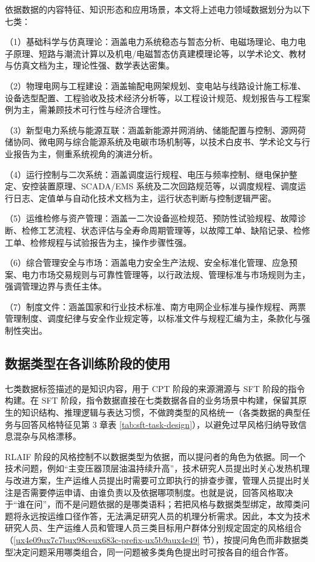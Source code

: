 \documentclass[fontset=fandol,type=master,campus=shenzhen,etitleauto=true]{hithesisbook}
\begin{document}
依据数据的内容特征、知识形态和应用场景，本文将上述电力领域数据划分为以下七类：

\noindent （1）基础科学与仿真理论：涵盖电力系统稳态与暂态分析、电磁场理论、电力电子原理、短路与潮流计算以及机电/电磁暂态仿真建模理论等，以学术论文、教材与仿真文档为主，理论性强、数学表达密集。

\noindent （2）物理电网与工程建设：涵盖输配电网架规划、变电站与线路设计施工标准、设备选型配置、工程验收及技术经济分析等，以工程设计规范、规划报告与工程案例为主，需兼顾技术可行性与经济合理性。

\noindent （3）新型电力系统与能源互联：涵盖新能源并网消纳、储能配置与控制、源网荷储协同、微电网与综合能源系统及电碳市场机制等，以技术白皮书、学术论文与行业报告为主，侧重系统视角的演进分析。

\noindent （4）运行控制与二次系统：涵盖调度运行规程、电压与频率控制、继电保护整定、安控装置原理、SCADA/EMS 系统及二次回路规范等，以调度规程、调度运行日志、定值单与自动化技术文档为主，运行状态判断与控制逻辑严密。

\noindent （5）运维检修与资产管理：涵盖一二次设备巡检规范、预防性试验规程、故障诊断、检修工艺流程、状态评估与全寿命周期管理等，以故障工单、缺陷记录、检修工单、检修规程与试验报告为主，操作步骤性强。

\noindent （6）综合管理安全与市场：涵盖电力安全生产法规、安全标准化管理、应急预案、电力市场交易规则与可靠性管理等，以行政法规、管理标准与市场规则为主，强调管理边界与责任主体。

\noindent （7）制度文件：涵盖国家和行业技术标准、南方电网企业标准与操作规程、两票管理制度、调度纪律与安全作业规定等，以标准文件与规程汇编为主，条款化与强制性突出。

\subsection{数据类型在各训练阶段的使用}\label{subsec:data-mapping}

七类数据标签描述的是知识内容，用于 CPT 阶段的来源溯源与 SFT 阶段的指令构建。在 SFT 阶段，指令数据直接在七类数据各自的业务场景中构建，保留其原生的知识结构、推理逻辑与表达习惯，不做跨类型的风格统一（各类数据的典型任务与回答风格特征见第 3 章表 \ref{tab:sft-task-design}），以避免过早风格归纳导致信息混杂与风格漂移。

RLAIF 阶段的风格控制不以数据类型为依据，而以提问者的角色为依据。同一个技术问题，例如“主变压器顶层油温持续升高”，技术研究人员提出时关心发热机理与改进方案，生产运维人员提出时需要可立即执行的排查步骤，管理人员提出时关注是否需要停运申请、由谁负责以及依据哪项制度。也就是说，回答风格取决于“谁在问”，而不是问题依据的是哪类语料；若把风格与数据类型绑定，故障类问题将永远按运维口径作答，无法满足研究人员的机理分析需求。因此，本文为技术研究人员、生产运维人员和管理人员三类目标用户群体分别规定固定的风格组合（\ref{ux4e09ux7c7bux98ceux683c-prefix-ux5b9aux4e49} 节），按提问角色而非数据类型决定问题采用哪类组合，同一问题被多类角色提出时可按各自的组合作答。
\end{document}
